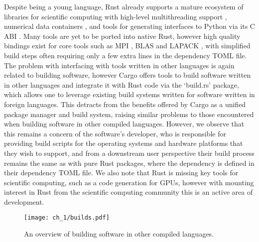 Despite being a young language, Rust already supports a mature ecosystem of libraries for scientific computing with high-level multithreading support \cite{rayon2018github}, numerical data containers \cite{ndarray2022github}, and tools for generating interfaces to Python via its C ABI \cite{maturin2022github}. Many tools are yet to be ported into native Rust, however high quality bindings exist for core tools such as MPI \cite{rsmpi2018github}, BLAS and LAPACK \cite{blaslapackrust2022github}, with simplified build steps often requiring only a few extra lines in the dependency TOML file. The problem with interfacing with tools written in other languages is again related to building software, however Cargo offers tools to build software written in other languages and integrate it with Rust code via the `build.rs' package, which allows one to leverage existing build systems written for software written in foreign languages. This detracts from the benefits offered by Cargo as a unified package manager and build system, raising similar problems to those encountered when building software in other compiled languages. However, we observe that this remains a concern of the software's developer, who is responsible for providing build scripts for the operating systems and hardware platforms that they wish to support, and from a downstream user perspective their build process remains the same as with pure Rust packages, where the dependency is defined in their dependency TOML file. We also note that Rust is missing key tools for scientific computing, such as a code generation for GPUs, however with mounting interest in Rust from the scientific computing community this is an active area of development.


\begin{figure}
    \centerline{\texttt{[image: ch\_1/builds.pdf]}}
    \caption{An overview of building software in other compiled languages.}
    \label{fig:chpt:1:sec:2:builds}
\end{figure}

